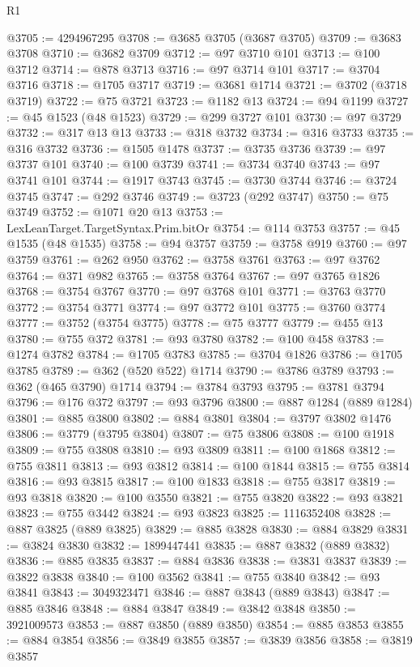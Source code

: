\begin{lexlean}{R1}
\begin{coremodule}
@3705 := 4294967295
@3708 := @3685 @3705 (@3687 @3705)
@3709 := @3683 @3708
@3710 := @3682 @3709
@3712 := @97 @3710 @101
@3713 := @100 @3712
@3714 := @878 @3713
@3716 := @97 @3714 @101
@3717 := @3704 @3716
@3718 := @1705 @3717
@3719 := @3681 @1714
@3721 := @3702 (@3718 @3719)
@3722 := @75 @3721
@3723 := @1182 @13
@3724 := @94 @1199
@3727 := @45 @1523 (@48 @1523)
@3729 := @299 @3727 @101
@3730 := @97 @3729
@3732 := @317 @13 @13
@3733 := @318 @3732
@3734 := @316 @3733
@3735 := @316 @3732
@3736 := @1505 @1478
@3737 := @3735 @3736
@3739 := @97 @3737 @101
@3740 := @100 @3739
@3741 := @3734 @3740
@3743 := @97 @3741 @101
@3744 := @1917 @3743
@3745 := @3730 @3744
@3746 := @3724 @3745
@3747 := @292 @3746
@3749 := @3723 (@292 @3747)
@3750 := @75 @3749
@3752 := @1071 @20 @13
@3753 := LexLeanTarget.TargetSyntax.Prim.bitOr
@3754 := @114 @3753
@3757 := @45 @1535 (@48 @1535)
@3758 := @94 @3757
@3759 := @3758 @919
@3760 := @97 @3759
@3761 := @262 @950
@3762 := @3758 @3761
@3763 := @97 @3762
@3764 := @371 @982
@3765 := @3758 @3764
@3767 := @97 @3765 @1826
@3768 := @3754 @3767
@3770 := @97 @3768 @101
@3771 := @3763 @3770
@3772 := @3754 @3771
@3774 := @97 @3772 @101
@3775 := @3760 @3774
@3777 := @3752 (@3754 @3775)
@3778 := @75 @3777
@3779 := @455 @13
@3780 := @755 @372
@3781 := @93 @3780
@3782 := @100 @458
@3783 := @1274 @3782
@3784 := @1705 @3783
@3785 := @3704 @1826
@3786 := @1705 @3785
@3789 := @362 (@520 @522) @1714
@3790 := @3786 @3789
@3793 := @362 (@465 @3790) @1714
@3794 := @3784 @3793
@3795 := @3781 @3794
@3796 := @176 @372
@3797 := @93 @3796
@3800 := @887 @1284 (@889 @1284)
@3801 := @885 @3800
@3802 := @884 @3801
@3804 := @3797 @3802 @1476
@3806 := @3779 (@3795 @3804)
@3807 := @75 @3806
@3808 := @100 @1918
@3809 := @755 @3808
@3810 := @93 @3809
@3811 := @100 @1868
@3812 := @755 @3811
@3813 := @93 @3812
@3814 := @100 @1844
@3815 := @755 @3814
@3816 := @93 @3815
@3817 := @100 @1833
@3818 := @755 @3817
@3819 := @93 @3818
@3820 := @100 @3550
@3821 := @755 @3820
@3822 := @93 @3821
@3823 := @755 @3442
@3824 := @93 @3823
@3825 := 1116352408
@3828 := @887 @3825 (@889 @3825)
@3829 := @885 @3828
@3830 := @884 @3829
@3831 := @3824 @3830
@3832 := 1899447441
@3835 := @887 @3832 (@889 @3832)
@3836 := @885 @3835
@3837 := @884 @3836
@3838 := @3831 @3837
@3839 := @3822 @3838
@3840 := @100 @3562
@3841 := @755 @3840
@3842 := @93 @3841
@3843 := 3049323471
@3846 := @887 @3843 (@889 @3843)
@3847 := @885 @3846
@3848 := @884 @3847
@3849 := @3842 @3848
@3850 := 3921009573
@3853 := @887 @3850 (@889 @3850)
@3854 := @885 @3853
@3855 := @884 @3854
@3856 := @3849 @3855
@3857 := @3839 @3856
@3858 := @3819 @3857

\end{coremodule}
\end{lexlean}
